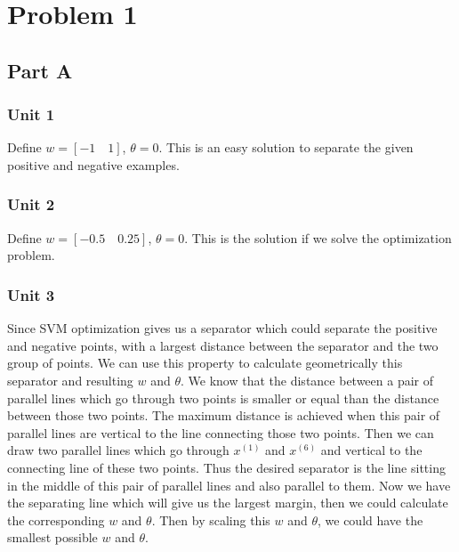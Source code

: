 

\oddsidemargin 0in
\evensidemargin 0in
\textwidth 6.5in
\topmargin -0.5in
\textheight 9.0in




\pagestyle{myheadings}  %

\section{Problem 1}
\subsection{Part A}
\subsubsection{Unit 1}
Define $w=[-1\quad1]$, $\theta=0$. This is an easy solution to separate the given positive and negative examples.
\subsubsection{Unit 2}
Define $w=[-0.5\quad0.25]$, $\theta=0$. This is the solution if we solve the optimization problem.
\subsubsection{Unit 3}
Since SVM optimization gives us a separator which could separate the positive and negative points, with a largest distance between the separator and the two group of points. We can use this property to calculate geometrically this separator and resulting $w$ and $\theta$. We know that the distance between a pair of parallel lines which go through two points is smaller or equal than the distance between those two points. The maximum distance is achieved when this pair of parallel lines are vertical to the line connecting those two points. Then we can draw two parallel lines which go through $x^{(1)}$ and $x^{(6)}$ and vertical to the connecting line of these two points. Thus the desired separator is the line sitting in the middle of this pair of parallel lines and also parallel to them. Now we have the separating line which will give us the largest margin, then we could calculate the corresponding $w$ and $\theta$. Then by scaling this $w$ and $\theta$, we could have the smallest possible $w$ and $\theta$.

